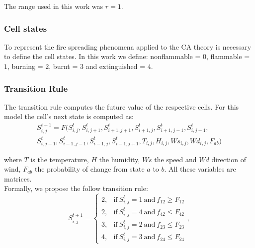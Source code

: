 \documentclass[conference]{IEEEtran}
\begin{document}
        The range used in this work was $r=1$.

          
      \subsubsection{Cell states}
      
        To represent the fire spreading phenomena applied to the CA theory is necessary to define the cell states. 
        In this work we define: nonflammable = $0$, flammable = $1$, burning = $2$, burnt = $3$ and extinguished = $4$.
          
      
      \subsubsection{Transition Rule}
      
        The transition rule computes the future value of the respective cells. For this model
        the cell’s next state is computed as: 
        \begin{equation}
          \begin{split}
            S_{i,j}^{t+1} = F(S_{i,j}^t,S_{i,j+1}^t, S_{i+1,j+1}^t,S_{i+1,j}^t, S_{i+1,j-1}^t, S_{i,j-1}^t, \\ \nonumber
            S_{i,j-1}^t, S_{i-1,j-1}^t, S_{i-1,j}^t, S_{i-1,j+1}^t, T_{i,j}, H_{i,j}, Ws_{i,j}, Wd_{i,j}, F_{ab})
          \end{split}                
        \end{equation}
        
        where $T$ is the temperature, $H$ the humidity, $Ws$ the speed and $Wd$ direction of wind, $F_{ab}$ the 
        probability of change from state $a$ to $b$. All these variables are matrices. \\
        
        Formally, we propose the follow transition rule:
        \begin{equation}
            S_{i,j}^{t+1} =
            \begin{cases}
                2, & \text{if} ~ S_{i,j}^{t} = 1 ~ \text{and} ~ f_{12} \geq F_{12} \\
                2, & \text{if} ~ S_{i,j}^{t} = 4 ~ \text{and} ~ f_{42} \leq F_{42} \\
                3, & \text{if} ~ S_{i,j}^{t} = 2 ~ \text{and} ~ f_{23} \leq F_{23} \\
                4, & \text{if} ~ S_{i,j}^{t} = 3 ~ \text{and} ~ f_{24} \leq F_{24}
            \end{cases},
            \label{eq:transition_rule}
        \end{equation}
        
\end{document}
